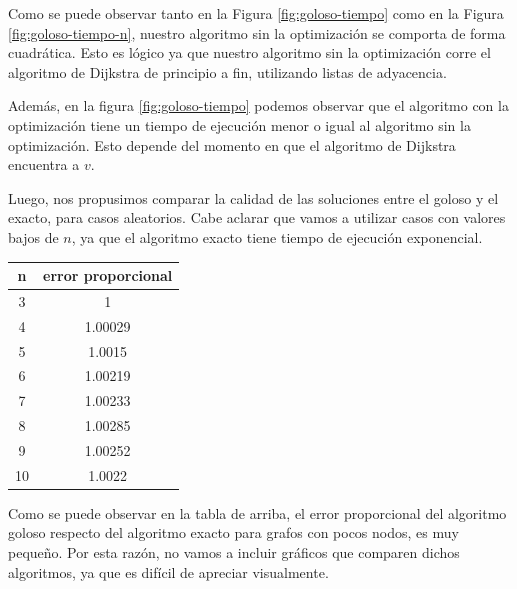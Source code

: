 Como se puede observar tanto en la Figura \ref{fig:goloso-tiempo} como en la Figura \ref{fig:goloso-tiempo-n}, nuestro algoritmo sin la optimización se comporta de forma cuadrática. Esto es lógico ya que nuestro algoritmo sin la optimización corre el algoritmo de Dijkstra de principio a fin, utilizando listas de adyacencia.

Además, en la figura \ref{fig:goloso-tiempo} podemos observar que el algoritmo con la optimización tiene un tiempo de ejecución menor o igual al algoritmo sin la optimización. Esto depende del momento en que el algoritmo de Dijkstra encuentra a $v$.

Luego, nos propusimos comparar la calidad de las soluciones entre el goloso y el exacto, para casos aleatorios. Cabe aclarar que vamos a utilizar casos con valores bajos de $n$, ya que el algoritmo exacto tiene tiempo de ejecución exponencial.

\begin{center}
 \begin{tabular}{|c|c|}
      \hline
      n&error proporcional \\
      \hline
      3&1\\
      4&1.00029\\
      5&1.0015\\
      6&1.00219\\
      7&1.00233\\
      8&1.00285\\
      9&1.00252\\
      10&1.0022\\
      \hline
    \end{tabular}
\end{center}

Como se puede observar en la tabla de arriba, el error proporcional del algoritmo goloso respecto del algoritmo exacto para grafos con pocos nodos, es muy pequeño. Por esta razón, no vamos a incluir gráficos que comparen dichos algoritmos, ya que es difícil de apreciar visualmente.


